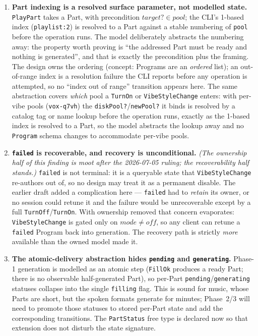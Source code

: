 \documentclass[a4paper,10pt,fleqn]{article}
\begin{document}
\begin{enumerate}
  \item \textbf{Part indexing is a resolved surface parameter, not modelled
    state.} \texttt{PlayPart} takes a Part, with precondition
    $target? \in pool$; the CLI's 1-based index (\texttt{playlist:2}) is
    resolved to a Part against a stable numbering of \texttt{pool} before the
    operation runs. The model deliberately abstracts the numbering away: the
    property worth proving is ``the addressed Part must be ready and nothing is
    generated'', and that is exactly the precondition plus the framing. The
    design owns the ordering (concept: Programs are an \emph{ordered} list); an
    out-of-range index is a resolution failure the CLI reports before any
    operation is attempted, so no ``index out of range'' transition appears
    here. The same abstraction covers \emph{which} pool a \texttt{TurnOn} or
    \texttt{VibeStyleChange} enters: with per-vibe pools (\texttt{vox-q7vh}) the
    \texttt{diskPool?}/\texttt{newPool?} it binds is resolved by a catalog tag
    or name lookup before the operation runs, exactly as the 1-based index is
    resolved to a Part, so the model abstracts the lookup away and no
    \texttt{Program} schema changes to accommodate per-vibe pools.

  \item \textbf{\texttt{failed} is recoverable, and recovery is unconditional.}
    \emph{(The ownership half of this finding is moot after the 2026-07-05
    ruling; the recoverability half stands.)} \texttt{failed} is not terminal:
    it is a queryable state that \texttt{VibeStyleChange} re-authors out of, so
    no design may treat it as a permanent disable. The earlier draft added a
    complication here --- \texttt{failed} had to \emph{retain} its owner, or no
    session could retune it and the failure would be unrecoverable except by a
    full \texttt{TurnOff}/\texttt{TurnOn}. With ownership removed that concern
    evaporates: \texttt{VibeStyleChange} is gated only on $mode \neq off$, so any
    client can retune a \texttt{failed} Program back into generation. The
    recovery path is strictly \emph{more} available than the owned model made
    it.

  \item \textbf{The atomic-delivery abstraction hides \texttt{pending} and
    \texttt{generating}.} Phase-1 generation is modelled as an atomic step
    (\texttt{FillOk} produces a ready Part; there is no observable half-generated
    Part), so per-Part \texttt{pending}/\texttt{generating} statuses collapse
    into the single \texttt{filling} flag. This is sound for music, whose Parts
    are short, but the spoken formats generate for minutes; Phase~2/3 will need
    to promote those statuses to stored per-Part state and add the corresponding
    transitions. The \texttt{PartStatus} free type is declared now so that
    extension does not disturb the state signature.
\end{enumerate}
\end{document}
